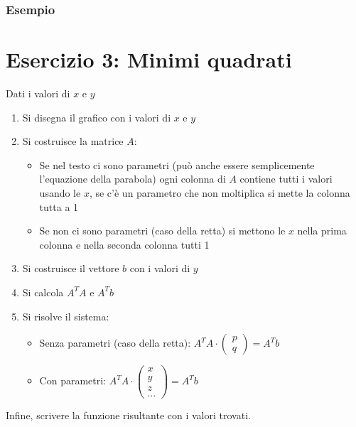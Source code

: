 \documentclass[10pt]{article}
\begin{document}
\subsubsection*{Esempio}
\section*{Esercizio 3: Minimi quadrati}
Dati i valori di $x$ e $y$
\begin{enumerate}
    \item Si disegna il grafico con i valori di $x$ e $y$
    \item Si costruisce la matrice $A$: \begin{itemize}
        \item Se nel testo ci sono parametri (può anche essere semplicemente l'equazione della parabola) ogni colonna di $A$ contiene tutti i valori usando le $x$, se c'è un parametro che non moltiplica si mette la colonna tutta a 1
        \item Se non ci sono parametri (caso della retta) si mettono le $x$ nella prima colonna e nella seconda colonna tutti 1
    \end{itemize}
    \item Si costruisce il vettore $b$ con i valori di $y$
    \item Si calcola $A^{T}A$ e $A^{T}b$
    \item Si risolve il sistema: \begin{itemize}
        \item Senza parametri (caso della retta): $A^{T}A\cdot\begin{pmatrix}
            p \\ q
        \end{pmatrix} = A^{T}b$
        \item Con parametri: $A^{T}A\cdot\begin{pmatrix}
            x \\ y \\ z \\ \ldots
        \end{pmatrix} = A^{T}b$
    \end{itemize}
\end{enumerate}
Infine, scrivere la funzione risultante con i valori trovati.
\end{document}
